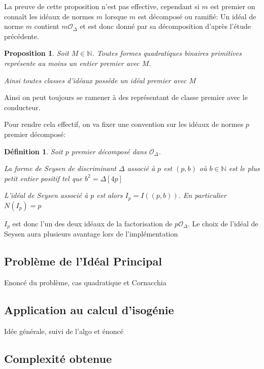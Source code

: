 \documentclass{article}
\newcommand{\N}[0]{\mathbb{N}}
\newcommand{\OR}[0]{\mathcal{O}}
\newtheorem{Prop}[The]{Proposition}
\newtheorem{Def}[The]{Définition}
\begin{document}
La preuve de cette proposition n'est pas effective, cependant si $m$ est premier on connaît les idéaux de normes $m$ lorsque $m$ est décomposé ou ramifié: Un idéal de norme $m$ contient $m\OR_{\Delta}$ et est donc donné par sa décomposition d'après l'étude précédente. 

\begin{Prop}
	Soit $M\in\N$. Toutes formes quadratiques binaires primitives représente au moins un entier premier avec $M$.
	
	Ainsi toutes classes d'idéaux possède un idéal premier avec $M$
\end{Prop}

Ainsi on peut toujours se ramener à des représentant de classe premier avec le conducteur. 

Pour rendre cela effectif, on va fixer une convention sur les idéaux de normes $p$ premier décomposé:

\begin{Def}
	Soit $p$ premier décomposé dans $\OR_{\Delta}$. 
	
	La forme de Seysen de discriminant $\Delta$ associé à $p$ est $(p,b)$ où $b\in\N$ est le plus petit entier positif tel que $b^2 = \Delta [4p]$
	
	L'idéal de Seysen associé à $p$ est alors $I_{p} = I((p,b))$. En particulier $N(I_{p}) = p$
\end{Def}

$I_{p}$ est donc l'un des deux idéaux de la factorisation de $p\OR_{\Delta}$. Le choix de l'idéal de Seysen aura plusieurs avantage lors de l'implémentation



\subsection{Problème de l'Idéal Principal}
Enoncé du problème, cas quadratique et Cornacchia

\subsection{Application au calcul d'isogénie}
Idée générale, suivi de l'algo et énoncé

\subsection{Complexité obtenue}

\printbibliography
\end{document}
